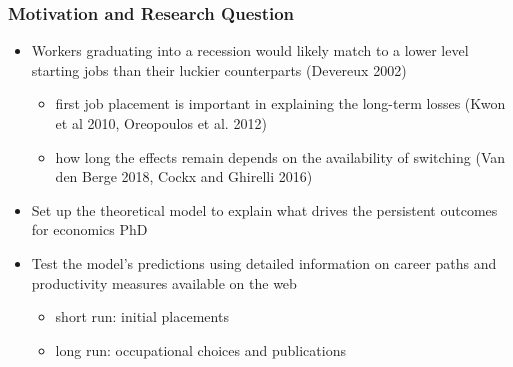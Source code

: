 \documentclass[11pt]{beamer}
\begin{document}
\begin{frame}[label = motivation]
	\frametitle{Motivation and Research Question} 
	\begin{itemize}

			\item Workers graduating into a recession would likely match to a lower level starting jobs than their luckier counterparts (Devereux 2002)
		\begin{itemize}
			\item first job placement is important in explaining the long-term losses (Kwon et al 2010, Oreopoulos et al. 2012)
			\vspace{1 mm}
			\item how long the effects remain depends on the availability of switching (Van den Berge 2018, Cockx and Ghirelli 2016)
		\end{itemize}
		

		\vspace{1.5 mm}
	\item Set up the theoretical model to explain what drives the persistent outcomes for economics PhD
		\vspace{1.5 mm}
	\item Test the model's predictions using detailed information on career paths and productivity measures  available on the web
			\begin{itemize}
		\item short run: initial placements
			\vspace{1 mm}
		\item long run: occupational choices and publications 
	\end{itemize}
%			
	

\end{itemize}
\end{frame}
\end{document}
